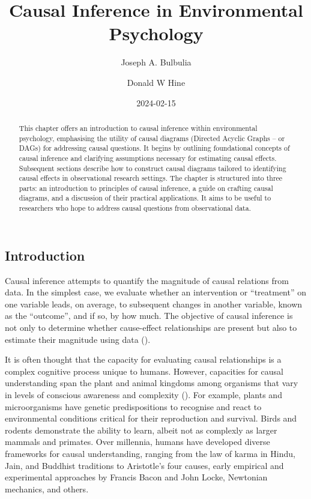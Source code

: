 \documentclass[
  singlecolumn]{article}
\title{Causal Inference in Environmental Psychology}
\author{Joseph A. Bulbulia \and Donald W Hine}
\date{2024-02-15}
\begin{document}
\maketitle
\begin{abstract}
This chapter offers an introduction to causal inference within
environmental psychology, emphasising the utility of causal diagrams
(Directed Acyclic Graphs -- or DAGs) for addressing causal questions. It
begins by outlining foundational concepts of causal inference and
clarifying assumptions necessary for estimating causal effects.
Subsequent sections describe how to construct causal diagrams tailored
to identifying causal effects in observational research settings. The
chapter is structured into three parts: an introduction to principles of
causal inference, a guide on crafting causal diagrams, and a discussion
of their practical applications. It aims to be useful to researchers who
hope to address causal questions from observational data.
\end{abstract}

\subsection{Introduction}\label{introduction}

Causal inference attempts to quantify the magnitude of causal relations
from data. In the simplest case, we evaluate whether an intervention or
``treatment'' on one variable leads, on average, to subsequent changes
in another variable, known as the ``outcome'', and if so, by how much.
The objective of causal inference is not only to determine whether
cause-effect relationships are present but also to estimate their
magnitude using data ().

It is often thought that the capacity for evaluating causal
relationships is a complex cognitive process unique to humans. However,
capacities for causal understanding span the plant and animal kingdoms
among organisms that vary in levels of conscious awareness and
complexity (). For
example, plants and microorganisms have genetic predispositions to
recognise and react to environmental conditions critical for their
reproduction and survival. Birds and rodents demonstrate the ability to
learn, albeit not as complexly as larger mammals and primates. Over
millennia, humans have developed diverse frameworks for causal
understanding, ranging from the law of karma in Hindu, Jain, and
Buddhist traditions to Aristotle's four causes, early empirical and
experimental approaches by Francis Bacon and John Locke, Newtonian
mechanics, and others.
\end{document}
